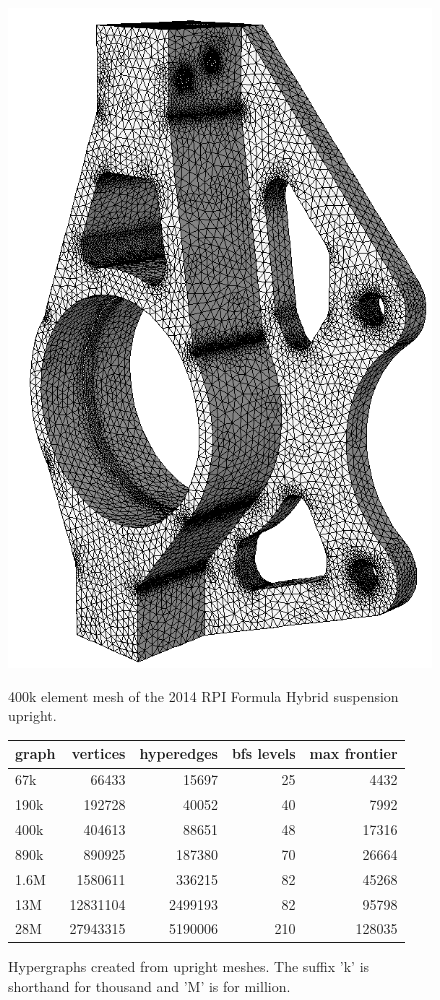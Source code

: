 \documentclass[graybox]{svmult}
\begin{document}
\begin{figure}
  \begin{minipage}{0.4\textwidth}
    \label{fig:upright}
    \centering
    \includegraphics[width=.4\textwidth]{images/upright400k.png}
    \caption{400k element mesh of the 2014 RPI Formula Hybrid suspension upright.}
  \end{minipage}\hfill
  \begin{minipage}{0.5\textwidth}
    \label{tbl:uprightCounts}
    \begin{tabular}{l|rrrr}
      graph & vertices & hyperedges & bfs levels & max frontier  \\
      \hline
      67k   & 66433    & 15697      & 25         & 4432          \\
      190k  & 192728   & 40052      & 40         & 7992          \\
      400k  & 404613   & 88651      & 48         & 17316         \\
      890k  & 890925   & 187380     & 70         & 26664         \\
      1.6M  & 1580611  & 336215     & 82         & 45268         \\
      13M   & 12831104 & 2499193    & 82         & 95798         \\
      28M   & 27943315 & 5190006    & 210        & 128035
    \end{tabular}
    \caption{Hypergraphs created from upright meshes. The suffix 'k' is shorthand
    for thousand and 'M' is for million.}
  \end{minipage}
\end{figure}
\end{document}
